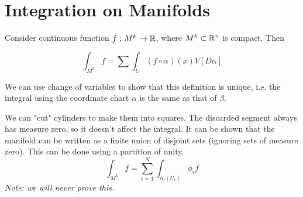 \documentclass[12pt]{article}
\begin{document}
\section{Integration on Manifolds}

Consider continuous function $f: M^k \rightarrow \mathbb{R}$, where $M^k \subset \mathbb{R}^n$ is compact. Then

\begin{defn}
    $$\int_{M^k} f = \sum \int_U (f\circ\alpha)(x)V[D\alpha]$$
\end{defn}

We can use change of variables to show that this definition is unique, i.e. the integral using the coordinate chart $\alpha$ is the same as that of $\beta$.

\begin{thm}
    We can "cut" cylinders to make them into squares. The discarded segment always has measure zero, so it doesn't affect the integral. It can be shown that the manifold can be written as a finite union of disjoint sets (ignoring sets of measure zero). This can be done using a partition of unity.
    $$\int_{M^k} f = \sum_{i=1}^N \int_{\alpha_i(U_i)} \phi_i f$$
    \textit{Note: we will never prove this.}
\end{thm}
\end{document}
